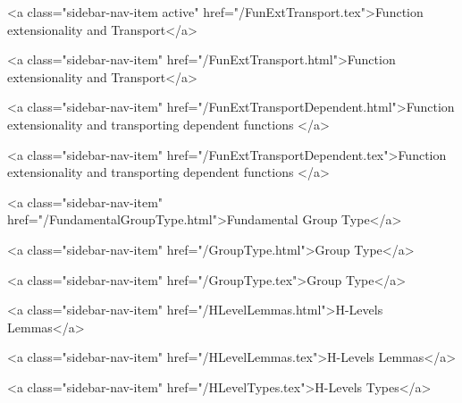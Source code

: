       
    
      
        
          <a class="sidebar-nav-item active" href="/FunExtTransport.tex">Function extensionality and Transport</a>
        
      
    
      
        
          <a class="sidebar-nav-item" href="/FunExtTransport.html">Function extensionality and Transport</a>
        
      
    
      
        
          <a class="sidebar-nav-item" href="/FunExtTransportDependent.html">Function extensionality and transporting dependent functions </a>
        
      
    
      
        
          <a class="sidebar-nav-item" href="/FunExtTransportDependent.tex">Function extensionality and transporting dependent functions </a>
        
      
    
      
        
          <a class="sidebar-nav-item" href="/FundamentalGroupType.html">Fundamental Group Type</a>
        
      
    
      
        
          <a class="sidebar-nav-item" href="/GroupType.html">Group Type</a>
        
      
    
      
        
          <a class="sidebar-nav-item" href="/GroupType.tex">Group Type</a>
        
      
    
      
        
          <a class="sidebar-nav-item" href="/HLevelLemmas.html">H-Levels Lemmas</a>
        
      
    
      
        
          <a class="sidebar-nav-item" href="/HLevelLemmas.tex">H-Levels Lemmas</a>
        
      
    
      
        
          <a class="sidebar-nav-item" href="/HLevelTypes.tex">H-Levels Types</a>
        
      
    

